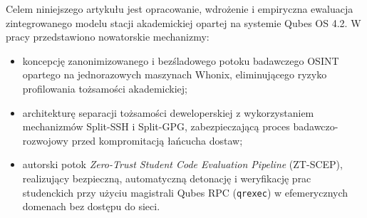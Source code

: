 Celem niniejszego artykułu jest opracowanie, wdrożenie i empiryczna ewaluacja zintegrowanego modelu stacji akademickiej opartej na systemie Qubes OS 4.2. W pracy przedstawiono nowatorskie mechanizmy:
\begin{itemize}
    \item koncepcję zanonimizowanego i bezśladowego potoku badawczego OSINT opartego na jednorazowych maszynach Whonix, eliminującego ryzyko profilowania tożsamości akademickiej;
    \item architekturę separacji tożsamości deweloperskiej z wykorzystaniem mechanizmów Split-SSH i Split-GPG, zabezpieczającą proces badawczo-rozwojowy przed kompromitacją łańcucha dostaw;
    \item autorski potok \textit{Zero-Trust Student Code Evaluation Pipeline} (ZT-SCEP), realizujący bezpieczną, automatyczną detonację i weryfikację prac studenckich przy użyciu magistrali Qubes RPC (\texttt{qrexec}) w efemerycznych domenach bez dostępu do sieci.
\end{itemize}
